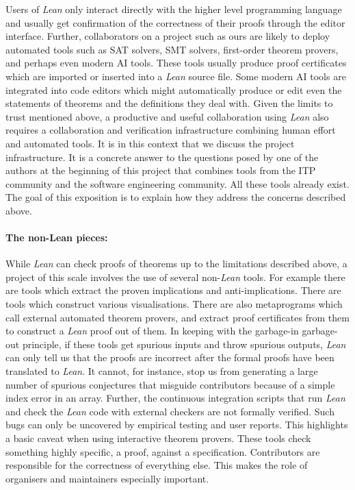 Users of \emph{Lean} only interact directly with the higher level programming language and usually get confirmation of the correctness of their proofs through the editor interface. Further, collaborators on a project such as ours are likely to deploy automated tools such as SAT solvers, SMT solvers, first-order theorem provers, and perhaps even modern AI tools. These tools usually produce proof certificates which are imported or inserted into a \emph{Lean} source file. Some modern AI tools are integrated into code editors which might automatically produce or edit even the statements of theorems and the definitions they deal with. Given the limits to trust mentioned above, a productive and useful collaboration using \emph{Lean} also requires a collaboration and verification infrastructure combining human effort and automated tools. It is in this context that we discuss the project infrastructure. It is a concrete answer to the questions posed by one of the authors at the beginning of this project \cite{Tao_blog_Sep_2024} that combines tools from the ITP community and the software engineering community. All these tools already exist. The goal of this exposition is to explain how they address the concerns described above.


\paragraph{\textbf{The non-Lean pieces:}} While \emph{Lean} can check proofs of theorems up to the limitations described above, a project of this scale involves the use of several non-\emph{Lean} tools. For example there are tools which extract the proven implications and anti-implications. There are tools which construct various visualisations. There are also metaprograms which call external automated theorem provers, and extract proof certificates from them to construct a \emph{Lean} proof out of them. In keeping with the garbage-in garbage-out principle, if these tools get spurious inputs and throw spurious outputs, \emph{Lean} can only tell us that the proofs are incorrect after the formal proofs have been translated to \emph{Lean}. It cannot, for instance, stop us from generating a large number of spurious conjectures that misguide contributors because of a simple index error in an array. Further, the continuous integration scripts that run \emph{Lean} and check the \emph{Lean} code with external checkers are not formally verified. Such bugs can only be uncovered by empirical testing and user reports. This highlights a basic caveat when using interactive theorem provers. These tools check something highly specific, a proof, against a specification. Contributors are responsible for the correctness of everything else. This makes the role of organisers and maintainers especially important.

